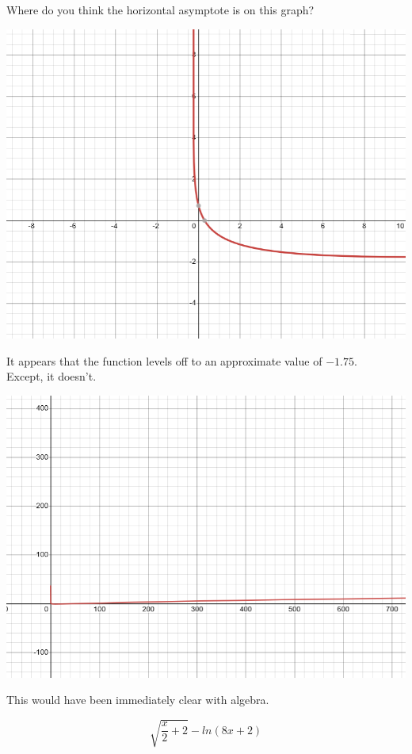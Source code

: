\documentclass{ximera}
\begin{document}
\begin{example}


Where do you think the horizontal asymptote is on this graph?

\begin{image}
\includegraphics{pics/graph_1A.png}
\end{image}

It appears that the function levels off to an approximate value of $-1.75$. \\


Except, it doesn't.

\begin{image}
\includegraphics{pics/graph_1B.png}
\end{image}

This would have been immediately clear with algebra.

\[  \sqrt{\frac{x}{2}+2} - ln(8x+2)      \]


\end{example}
\end{document}
